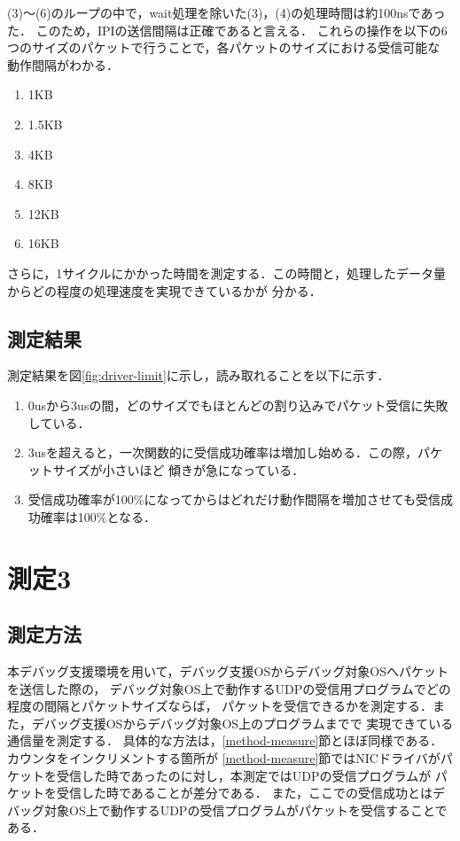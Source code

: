 \documentclass[12pt]{jsarticle}
\begin{document}
(3)〜(6)のループの中で，wait処理を除いた(3)，(4)の処理時間は約100nsであった．
このため，IPIの送信間隔は正確であると言える．
これらの操作を以下の6つのサイズのパケットで行うことで，各パケットのサイズにおける受信可能な
動作間隔がわかる．
\begin{enumerate}
    \item 1KB
    \item 1.5KB
    \item 4KB
    \item 8KB
    \item 12KB
    \item 16KB
\end{enumerate}
さらに，1サイクルにかかった時間を測定する．この時間と，処理したデータ量からどの程度の処理速度を実現できているかが
分かる．

\subsection{測定結果}\label{result-driver-limit}

測定結果を図\ref{fig:driver-limit}に示し，読み取れることを以下に示す．

\begin{enumerate}
    \item 0usから3usの間，どのサイズでもほとんどの割り込みでパケット受信に失敗している．
    \item 3usを超えると，一次関数的に受信成功確率は増加し始める．この際，パケットサイズが小さいほど
        傾きが急になっている．
    \item 受信成功確率が100\%になってからはどれだけ動作間隔を増加させても受信成功確率は100\%となる．
\end{enumerate}

\section{測定3}

\subsection{測定方法}

本デバッグ支援環境を用いて，デバッグ支援OSからデバッグ対象OSへパケットを送信した際の，
デバッグ対象OS上で動作するUDPの受信用プログラムでどの程度の間隔とパケットサイズならば，
パケットを受信できるかを測定する．また，デバッグ支援OSからデバッグ対象OS上のプログラムまでで
実現できている通信量を測定する．
具体的な方法は，\ref{method-measure}節とほぼ同様である．カウンタをインクリメントする箇所が
\ref{method-measure}節ではNICドライバがパケットを受信した時であったのに対し，本測定ではUDPの受信プログラムが
パケットを受信した時であることが差分である．
また，ここでの受信成功とはデバッグ対象OS上で動作するUDPの受信プログラムがパケットを受信することである．
\end{document}
